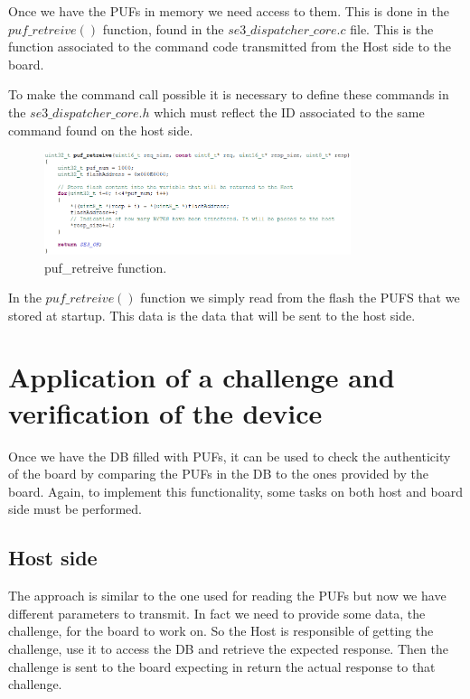 Once we have the PUFs in memory we need access to them. This is done in the $puf\_retreive()$ function, found in the $se3\_dispatcher\_core.c$ file. This is the function associated to the command code transmitted from the Host side to the board.

To make the command call possible it is necessary to define these commands in the $se3\_dispatcher\_core.h$ which must reflect the ID associated to the same command found on the host side.

\begin{figure}[h!]
	\vspace{0.5cm}
	\includegraphics[width = 0.8\textwidth]{images/puf_retreive.png}
	\caption{puf\_retreive function. }
	\label{fig:puf_retreive}
\end{figure}

In the $puf\_retreive()$ function we simply read from the flash the PUFS that we stored at startup. This data is the data that will be sent to the host side.


\section {Application of a challenge and verification of the device} 
\label{section:impl_host}

Once we have the DB filled with PUFs, it can be used to check the authenticity of the board by comparing the PUFs in the DB to the ones provided by the board. Again, to implement this functionality, some tasks on both host and board side must be performed.

\subsection{Host side}

The approach is similar to the one used for reading the PUFs but now we have different parameters to transmit. In fact we need to provide some data, the challenge, for the board to work on. So the Host is responsible of getting the challenge, use it to access the DB and retrieve the expected response. Then the challenge is sent to the board expecting in return the actual response to that challenge.

